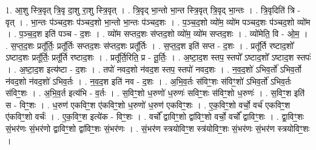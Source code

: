 \documentclass[17pt]{extarticle}
\begin{document}
1. आ॒शु स्त्रि॒वृत् त्रि॒वृ दा॒शु रा॒शु स्त्रि॒वृत् । . त्रि॒वृद् भा॒न्तो भा॒न्त स्त्रि॒वृत् त्रि॒वृद् भा॒न्तः । . त्रि॒वृदिति॑ त्रि - वृत् । . भा॒न्तः प॑ञ्चद॒शः प॑ञ्चद॒शो भा॒न्तो भा॒न्तः प॑ञ्चद॒शः । . प॒ञ्च॒द॒शो व्यो॑म॒ व्यो॑म पञ्चद॒शः प॑ञ्चद॒शो व्यो॑म । . प॒ञ्च॒द॒श इति॑ पञ्च - द॒शः । . व्यो॑म सप्तद॒शः स॑प्तद॒शो व्यो॑म॒ व्यो॑म सप्तद॒शः । . व्यो॑मेति॒ वि - ओ॒म॒ । . स॒प्त॒द॒शः प्रतू᳚र्तिः॒ प्रतू᳚र्तिः सप्तद॒शः स॑प्तद॒शः प्रतू᳚र्तिः । . स॒प्त॒द॒श इति॑ सप्त - द॒शः । . प्रतू᳚र्ति रष्टाद॒शो᳚ ऽष्टाद॒शः प्रतू᳚र्तिः॒ प्रतू᳚र्ति रष्टाद॒शः । . प्रतू᳚र्ति॒रिति॒ प्र - तू॒र्तिः॒ । . अ॒ष्टा॒द॒श स्तप॒ स्तपो᳚ ऽष्टाद॒शो᳚ ऽष्टाद॒श स्तपः॑ । . अ॒ष्टा॒द॒श इत्य॑ष्टा - द॒शः । . तपो॑ नवद॒शो न॑वद॒श स्तप॒ स्तपो॑ नवद॒शः । . न॒व॒द॒शो॑ ऽभिव॒र्तो॑ ऽभिव॒र्तो न॑वद॒शो न॑वद॒शो॑ ऽभिव॒र्तः । . न॒व॒द॒श इति॑ नव - द॒शः । . अ॒भि॒व॒र्तः स॑विꣳ॒॒शः स॑विꣳ॒॒शो॑ ऽभिव॒र्तो॑ ऽभिव॒र्तः स॑विꣳ॒॒शः । . अ॒भि॒व॒र्त इत्य॑भि - व॒र्तः । . स॒विꣳ॒॒शो ध॒रुणो॑ ध॒रुणः॑ सविꣳ॒॒शः स॑विꣳ॒॒शो ध॒रुणः॑ । . स॒विꣳ॒॒श इति॑ स - विꣳ॒॒शः । . ध॒रुण॑ एकविꣳ॒॒श ए॑कविꣳ॒॒शो ध॒रुणो॑ ध॒रुण॑ एकविꣳ॒॒शः । . ए॒क॒विꣳ॒॒शो वर्चो॒ वर्च॑ एकविꣳ॒॒श ए॑कविꣳ॒॒शो वर्चः॑ । . ए॒क॒विꣳ॒॒श इत्ये॑क - विꣳ॒॒शः । . वर्चो᳚ द्वाविꣳ॒॒शो द्वा॑विꣳ॒॒शो वर्चो॒ वर्चो᳚ द्वाविꣳ॒॒शः । . द्वा॒विꣳ॒॒शः सं॒भर॑णः सं॒भर॑णो द्वाविꣳ॒॒शो द्वा॑विꣳ॒॒शः सं॒भर॑णः । . सं॒भर॑ण स्त्रयोविꣳ॒॒श स्त्र॑योविꣳ॒॒शः सं॒भर॑णः सं॒भर॑ण स्त्रयोविꣳ॒॒शः । \newline
\end{document}
